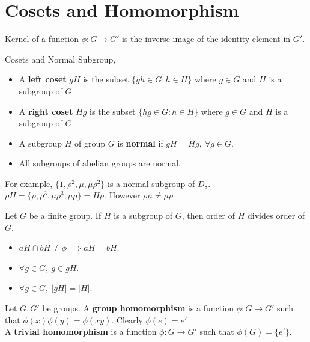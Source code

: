 \section{Cosets and Homomorphism}
\begin{definition}
	Kernel of a function $\phi : G \to G'$ is the inverse image of the identity element in $G'$. %
\end{definition}

\begin{definition}Cosets and Normal Subgroup,
	\begin{itemize}
		\item A \textbf{left coset} $gH$ is the subset $\{ gh \in G : h \in H \}$ where $g \in G$ and  $H$ is a subgroup of $G$.%
		\item A \textbf{right coset} $Hg$ is the subset $\{ hg \in G : h \in H \}$ where $g \in G$ and  $H$ is a subgroup of $G$.%
		\item A subgroup $H$ of group $G$ is \textbf{normal} if $gH = Hg,\ \forall g \in G$.
		\item All subgroups of abelian groups are normal.
	\end{itemize}
\end{definition}

\begin{remark}
	For example, $\{1,\rho^2,\mu,\mu\rho^2\}$ is a normal subgroup of $D_8$.\\
	$\rho H = \{ \rho, \rho^3, \mu\rho^3, \mu\rho \} = H\rho$. However $\rho\mu \ne \mu\rho$
\end{remark}
\begin{remark}%
	Let $G$ be a finite group. If $H$ is a subgroup of $G$, then order of $H$ divides order of $G$.
\end{remark}
\begin{itemize}
	\item $aH \cap bH \ne \phi \implies aH = bH$.
	\item $\forall g \in G,\ g \in gH$.
	\item $\forall g \in G,\ |gH| = |H|$.
\end{itemize}

\begin{definition}
	Let $G,G'$ be groups. A \textbf{group homomorphism} is a function $\phi : G \to G'$ such that $\phi(x)\phi(y) = \phi(xy)$. Clearly $\phi(e) = e'$\\
	A \textbf{trivial homomorphism} is a function $\phi : G \to G'$ such that $\phi(G) = \{ e' \}$.
\end{definition}



